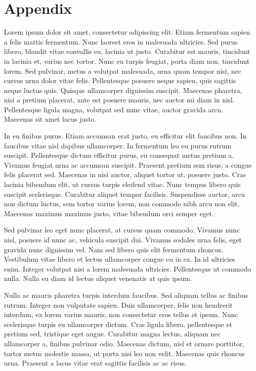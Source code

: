 \appendix

\section{Appendix}
\label{sec:appendix}
Lorem ipsum dolor sit amet, consectetur adipiscing elit. Etiam fermentum sapien a felis mattis fermentum. Nunc laoreet eros in malesuada ultricies. Sed purus libero, blandit vitae convallis eu, lacinia ut justo. Curabitur est mauris, tincidunt in lacinia et, varius nec tortor. Nunc eu turpis feugiat, porta diam non, tincidunt lorem. Sed pulvinar, metus a volutpat malesuada, urna quam tempor nisi, nec cursus urna dolor vitae felis. Pellentesque posuere neque sapien, quis sagittis neque luctus quis. Quisque ullamcorper dignissim suscipit. Maecenas pharetra, nisi a pretium placerat, ante est posuere mauris, nec auctor mi diam in nisl. Pellentesque ligula magna, volutpat sed nunc vitae, auctor gravida arcu. Maecenas sit amet lacus justo.

\vspace{2mm}

In eu finibus purus. Etiam accumsan erat justo, eu efficitur elit faucibus non. In faucibus vitae nisl dapibus ullamcorper. In fermentum leo eu purus rutrum suscipit. Pellentesque dictum efficitur purus, eu consequat metus pretium a. Vivamus feugiat urna ac accumsan suscipit. Praesent pretium sem risus, a congue felis placerat sed. Maecenas in nisi auctor, aliquet tortor ut, posuere justo. Cras lacinia bibendum elit, ut cursus turpis eleifend vitae. Nunc tempus libero quis suscipit scelerisque. Curabitur aliquet tempor facilisis. Suspendisse auctor, arcu non dictum luctus, sem tortor varius lorem, non commodo nibh arcu non elit. Maecenas maximus maximus justo, vitae bibendum orci semper eget.

\vspace{2mm}

Sed pulvinar leo eget nunc placerat, at cursus quam commodo. Vivamus nunc nisl, posuere id nunc ac, vehicula suscipit dui. Vivamus sodales urna felis, eget gravida nunc dignissim vel. Nam sed libero quis elit fermentum rhoncus. Vestibulum vitae libero et lectus ullamcorper congue eu in ex. In id ultricies enim. Integer volutpat nisi a lorem malesuada ultricies. Pellentesque ut commodo nulla. Nulla eu diam id lectus aliquet venenatis at quis ipsum.

\vspace{2mm}

Nulla ac mauris pharetra turpis interdum faucibus. Sed aliquam tellus ac finibus rutrum. Integer non vulputate sapien. Duis ullamcorper, felis non hendrerit interdum, ex lorem varius mauris, non consectetur eros tellus et ipsum. Nunc scelerisque turpis eu ullamcorper dictum. Cras ligula libero, pellentesque et pretium sed, tristique eget augue. Curabitur magna lectus, aliquam nec ullamcorper a, finibus pulvinar odio. Maecenas dictum, nisl et ornare porttitor, tortor metus molestie massa, ut porta nisi leo non velit. Maecenas quis rhoncus urna. Praesent a lacus vitae erat sagittis facilisis ac ac risus.

